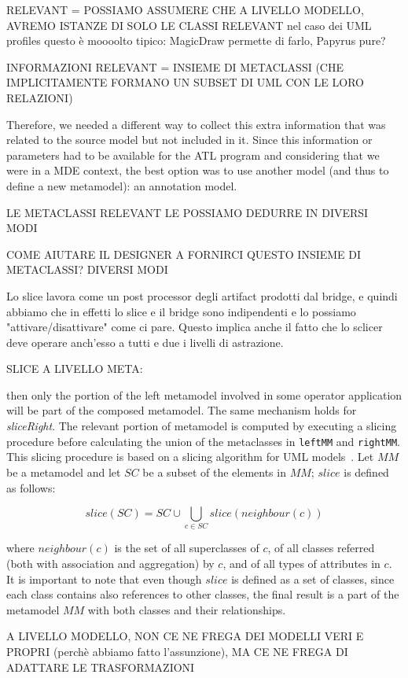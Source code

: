 RELEVANT = POSSIAMO ASSUMERE CHE A LIVELLO MODELLO, AVREMO ISTANZE DI SOLO LE CLASSI RELEVANT
nel caso dei UML profiles questo è moooolto tipico: MagicDraw permette di farlo, Papyrus pure?

INFORMAZIONI RELEVANT = INSIEME DI METACLASSI (CHE IMPLICITAMENTE FORMANO UN SUBSET DI UML CON LE LORO RELAZIONI) 

Therefore, we needed a different way to collect this extra information that was related to the source model but not included in it. Since this information or parameters had to be available for the ATL program and considering that we were in a MDE context, the best option was to use another model (and thus to define a new metamodel): an annotation model.

LE METACLASSI RELEVANT LE POSSIAMO DEDURRE IN DIVERSI MODI

COME AIUTARE IL DESIGNER A FORNIRCI QUESTO INSIEME DI METACLASSI? DIVERSI MODI

Lo slice lavora come un post processor degli artifact prodotti dal bridge, e quindi abbiamo che in effetti lo slice e il bridge sono indipendenti e lo possiamo "attivare/disattivare" come ci pare. Questo implica anche il fatto che lo sclicer deve operare anch'esso a tutti
e due i livelli di astrazione.

SLICE A LIVELLO META:

 then only the portion of
the left metamodel involved in some operator application will be
part of the composed metamodel. The same mechanism holds for
\textit{sliceRight}. The relevant portion of metamodel is computed
by executing a slicing procedure before calculating the union of the metaclasses in
\texttt{leftMM} and \texttt{rightMM}. This slicing procedure is based on a
slicing algorithm for UML models~\cite{UMLSlicer}. Let
$MM$ be a metamodel and let $SC$ be a subset of the elements in
$MM$; $slice$ is defined as follows:

\vspace{-.3cm}
$$slice(SC)=SC \cup \displaystyle\bigcup_{c \in
SC}{slice(neighbour(c))}$$
\vspace{-.2cm}

\noindent where $neighbour(c)$ is the set of all superclasses of
$c$, of all classes referred (both with association and
aggregation) by $c$, and of all types of attributes
in $c$. It is important to note that even though $slice$ is defined
as a set of classes, since each class contains also references
to other classes, the final result is a part of the metamodel $MM$
with both classes and their relationships.

A LIVELLO MODELLO, NON CE NE FREGA DEI MODELLI VERI E PROPRI (perchè abbiamo fatto l'assunzione), MA CE NE FREGA DI ADATTARE LE TRASFORMAZIONI


